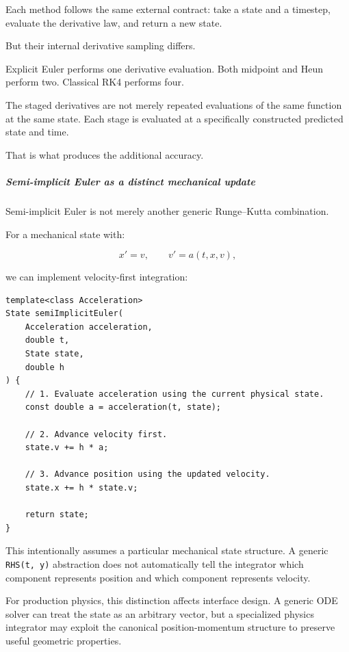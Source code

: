 Each method follows the same external contract: take a state and a timestep, evaluate the derivative law, and return a new state.

But their internal derivative sampling differs.

Explicit Euler performs one derivative evaluation. Both midpoint and Heun perform two. Classical RK4 performs four.

The staged derivatives are not merely repeated evaluations of the same function at the same state. Each stage is evaluated at a specifically constructed predicted state and time.

That is what produces the additional accuracy.

\subparagraph{Semi-implicit Euler as a distinct mechanical update}\label{02-foundations-ii-ch025-semi-implicit-euler-as-a-distinct-mechanical-update}

\hypertarget{02-foundations-ii-ch025-semi-implicit-euler-as-a-distinct-mechanical-update}{}

Semi-implicit Euler is not merely another generic Runge--Kutta combination.

For a mechanical state with:

\[
x'=v,\qquad v'=a(t,x,v),
\]

we can implement velocity-first integration:

\begin{verbatim}
template<class Acceleration>
State semiImplicitEuler(
    Acceleration acceleration,
    double t,
    State state,
    double h
) {
    // 1. Evaluate acceleration using the current physical state.
    const double a = acceleration(t, state);

    // 2. Advance velocity first.
    state.v += h * a;

    // 3. Advance position using the updated velocity.
    state.x += h * state.v;

    return state;
}
\end{verbatim}

This intentionally assumes a particular mechanical state structure. A generic \texttt{RHS(t,\ y)} abstraction does not automatically tell the integrator which component represents position and which component represents velocity.

For production physics, this distinction affects interface design. A generic ODE solver can treat the state as an arbitrary vector, but a specialized physics integrator may exploit the canonical position-momentum structure to preserve useful geometric properties.

